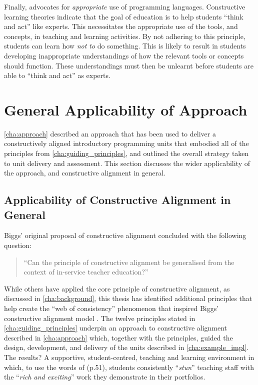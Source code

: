 Finally,  advocates for \emph{appropriate} use of programming languages. Constructive learning theories indicate that the goal of education is to help students ``think and act'' like experts. This necessitates the appropriate use of the tools, and concepts, in teaching and learning activities. By not adhering to this principle, students can learn how \emph{not to} do something. This is likely to result in students developing inappropriate understandings of how the relevant tools or concepts should function. These understandings must then be unlearnt before students are able to ``think and act'' as experts.


\section{General Applicability of Approach} %
\label{sec:approach_in_review}

\cref{cha:approach} described an approach that has been used to deliver a constructively aligned introductory programming units that embodied all of the principles from \cref{cha:guiding_principles}, and outlined the overall strategy taken to unit delivery and assessment. This section discusses the wider applicability of the approach, and constructive alignment in general.

\subsection{Applicability of Constructive Alignment in General} %
\label{sub:principles_underlying_constructive_alignment}

Biggs' original proposal of constructive alignment concluded with the following question:

\begin{quote}
	``Can the principle of constructive alignment be generalised from the context of in-service teacher education?'' \citet{Biggs:1996c}
\end{quote}

While others have applied the core principle of constructive alignment, as discussed in \cref{cha:background}, this thesis has identified additional principles that help create the ``web of consistency'' phenomenon that inspired Biggs' constructive alignment model \citep{Biggs:1996c,Biggs:1999}. The twelve principles stated in \cref{cha:guiding_principles} underpin an approach to constructive alignment described in \cref{cha:approach} which, together with the principles, guided the design, development, and delivery of the units described in \cref{cha:example_impl}. The results? A supportive, student-centred, teaching and learning environment in which, to use the words of \citet{Biggs:2007} (p.51), students consistently ``\emph{stun}'' teaching staff with the ``\emph{rich and exciting}'' work they demonstrate in their portfolios.

